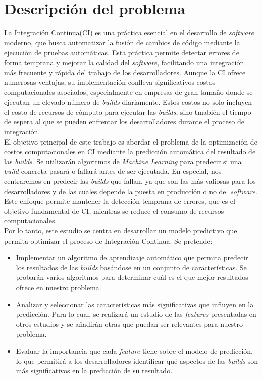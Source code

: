 \section{Descripción del problema}
La Integración Continua(CI) es una práctica esencial en el desarrollo de \textit{software}
moderno, que busca automatizar la fusión de cambios de código mediante la ejecución de pruebas
automáticas. Esta práctica permite detectar errores de forma temprana y mejorar la calidad del
\textit{software}, facilitando una integración más frecuente y rápida del trabajo de los
desarrolladores. Aunque la CI ofrece numerosas ventajas, su implementación conlleva
significativos costos computacionales asociados, especialmente en empresas de gran tamaño donde
se ejecutan un elevado número de \textit{builds} diariamente. Estos costos no solo incluyen el
costo de recursos de cómputo para ejecutar las \textit{builds}, sino tmabién el tiempo de espera
al que se pueden enfrentar los desarrolladores durante el proceso de integración. \\

El objetivo principal de este trabajo es abordar el problema de la optimización de costos
computacionales en CI mediante la predicción automática del resultado de las
\textit{builds}. Se utilizarán algoritmos de \textit{Machine Learning} para predecir si una
\textit{build} concreta pasará o fallará antes de ser ejecutada. En especial, nos centraremos
en predecir las \textit{builds} que fallan, ya que son las más valiosas para los desarrolladores
y de las cuales depende la puesta en producción o no del \textit{software}. Este enfoque
permite mantener la detección temprana de errores, que es el objetivo fundamental de CI,
mientras se reduce el consumo de recursos computacionales.\\

Por lo tanto, este estudio se centra en desarrollar un modelo predictivo que permita optimizar
el proceso de Integración Continua. Se pretende:

\begin{itemize}
    \item Implementar un algoritmo de aprendizaje automático que permita predecir los resultados
    de las \textit{builds} basándose en un conjunto de características. Se probarán varios
    algoritmos para determinar cuál es el que mejor resultados ofrece en nuestro problema.\\
    \item Analizar y seleccionar las características más significativas que influyen en la
    predicción. Para lo cual, se realizará un estudio de las \textit{features} presentadas en
    otros estudios y se añadirán otras que puedan ser relevantes para nuestro problema.\\
    \item Evaluar la importancia que cada \textit{feature} tiene sobre el modelo de predicción, lo
    que permitirá a los desarrolladores identificar qué aspectos de las \textit{builds} son
    más significativos en la predicción de su resultado.
\end{itemize}
